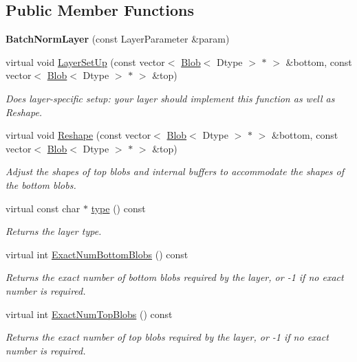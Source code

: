 \subsection*{Public Member Functions}
\begin{DoxyCompactItemize}
\item 
{\bfseries Batch\+Norm\+Layer} (const Layer\+Parameter \&param)\hypertarget{classcaffe_1_1BatchNormLayer_add0e20ed67cad3052669765cda52a7f0}{}\label{classcaffe_1_1BatchNormLayer_add0e20ed67cad3052669765cda52a7f0}

\item 
virtual void \hyperlink{classcaffe_1_1BatchNormLayer_ae4784dc3c124ea934b1d9736d465591f}{Layer\+Set\+Up} (const vector$<$ \hyperlink{classcaffe_1_1Blob}{Blob}$<$ Dtype $>$ $\ast$ $>$ \&bottom, const vector$<$ \hyperlink{classcaffe_1_1Blob}{Blob}$<$ Dtype $>$ $\ast$ $>$ \&top)
\begin{DoxyCompactList}\small\item\em Does layer-\/specific setup\+: your layer should implement this function as well as Reshape. \end{DoxyCompactList}\item 
virtual void \hyperlink{classcaffe_1_1BatchNormLayer_afb4c4da26887dfbd6d73ab35be17ed84}{Reshape} (const vector$<$ \hyperlink{classcaffe_1_1Blob}{Blob}$<$ Dtype $>$ $\ast$ $>$ \&bottom, const vector$<$ \hyperlink{classcaffe_1_1Blob}{Blob}$<$ Dtype $>$ $\ast$ $>$ \&top)
\begin{DoxyCompactList}\small\item\em Adjust the shapes of top blobs and internal buffers to accommodate the shapes of the bottom blobs. \end{DoxyCompactList}\item 
virtual const char $\ast$ \hyperlink{classcaffe_1_1BatchNormLayer_acf78346b46fa24e33337db9e155e4001}{type} () const \hypertarget{classcaffe_1_1BatchNormLayer_acf78346b46fa24e33337db9e155e4001}{}\label{classcaffe_1_1BatchNormLayer_acf78346b46fa24e33337db9e155e4001}

\begin{DoxyCompactList}\small\item\em Returns the layer type. \end{DoxyCompactList}\item 
virtual int \hyperlink{classcaffe_1_1BatchNormLayer_a30b42ad6c976170fc0a8c523682ff96a}{Exact\+Num\+Bottom\+Blobs} () const 
\begin{DoxyCompactList}\small\item\em Returns the exact number of bottom blobs required by the layer, or -\/1 if no exact number is required. \end{DoxyCompactList}\item 
virtual int \hyperlink{classcaffe_1_1BatchNormLayer_ad9fb4bf90a79a0a739ed1223628a88b9}{Exact\+Num\+Top\+Blobs} () const 
\begin{DoxyCompactList}\small\item\em Returns the exact number of top blobs required by the layer, or -\/1 if no exact number is required. \end{DoxyCompactList}\end{DoxyCompactItemize}
